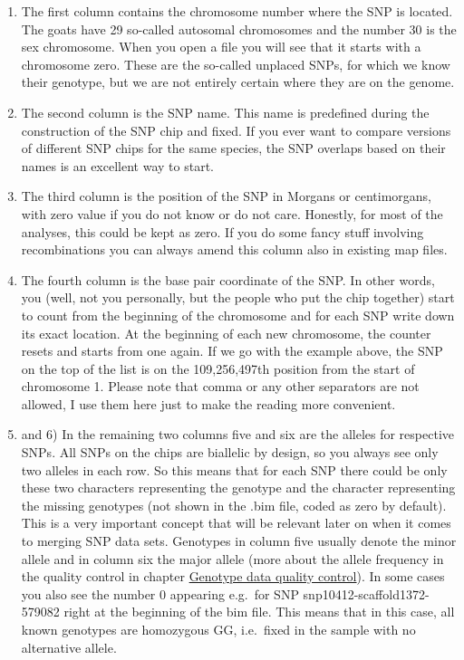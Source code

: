 \documentclass[]{book}
\begin{document}
\begin{enumerate}
\def\labelenumi{\arabic{enumi})}
\item
  The first column contains the chromosome number where the SNP is
  located. The goats have 29 so-called autosomal chromosomes and the
  number 30 is the sex chromosome. When you open a file you will see
  that it starts with a chromosome zero. These are the so-called
  unplaced SNPs, for which we know their genotype, but we are not
  entirely certain where they are on the genome.
\item
  The second column is the SNP name. This name is predefined during the
  construction of the SNP chip and fixed. If you ever want to compare
  versions of different SNP chips for the same species, the SNP overlaps
  based on their names is an excellent way to start.
\item
  The third column is the position of the SNP in Morgans or
  centimorgans, with zero value if you do not know or do not care.
  Honestly, for most of the analyses, this could be kept as zero. If you
  do some fancy stuff involving recombinations you can always amend this
  column also in existing map files.
\item
  The fourth column is the base pair coordinate of the SNP. In other
  words, you (well, not you personally, but the people who put the chip
  together) start to count from the beginning of the chromosome and for
  each SNP write down its exact location. At the beginning of each new
  chromosome, the counter resets and starts from one again. If we go
  with the example above, the SNP on the top of the list is on the
  109,256,497th position from the start of chromosome 1. Please note
  that comma or any other separators are not allowed, I use them here
  just to make the reading more convenient.
\item
  and 6) In the remaining two columns five and six are the alleles for
  respective SNPs. All SNPs on the chips are biallelic by design, so you
  always see only two alleles in each row. So this means that for each
  SNP there could be only these two characters representing the genotype
  and the character representing the missing genotypes (not shown in the
  .bim file, coded as zero by default). This is a very important concept
  that will be relevant later on when it comes to merging SNP data sets.
  Genotypes in column five usually denote the minor allele and in column
  six the major allele (more about the allele frequency in the quality
  control in chapter
  \protect\hyperlink{genotype-data-quality-control}{Genotype data
  quality control}). In some cases you also see the number 0 appearing
  e.g.~for SNP snp10412-scaffold1372-579082 right at the beginning of
  the bim file. This means that in this case, all known genotypes are
  homozygous GG, i.e.~fixed in the sample with no alternative allele.
\end{enumerate}
\end{document}

